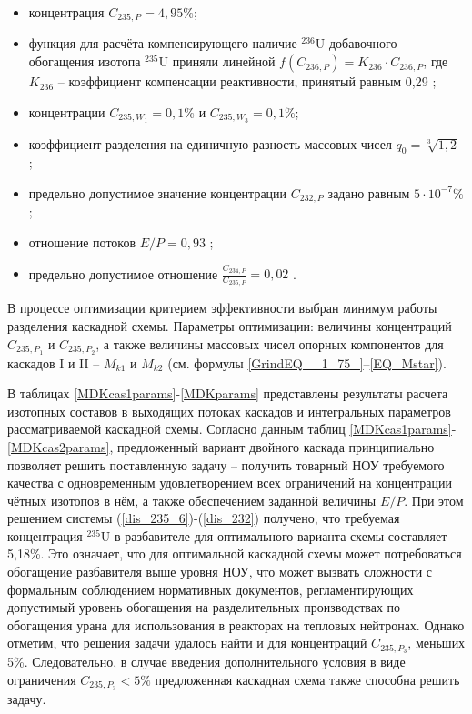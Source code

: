 \begin{itemize}
    \item концентрация $C_{235,{P}} = {4,95\%}$; 
    \item функция для расчёта компенсирующего наличие $^{236}$U добавочного обогащения изотопа $^{235}$U приняли линейной $f(C_{236,P}) = {K_{236}\cdot{C_{236,{P}}}}$, где $K_{236}$ -- коэффициент компенсации реактивности, принятый равным 0,29 \cite{smirnovEvolutionIsotopicComposition2012};
    \item концентрации $C_{235,{W_1}} = 0,1\%$ и $C_{235,{W_3}} = 0,1\%$;
    \item коэффициент разделения на единичную разность массовых чисел $q_{0} = \sqrt[3]{1,2}$ \cite{smirnovEvolutionIsotopicComposition2012};
    \item предельно допустимое значение концентрации $C_{232,{P}}$ задано равным $5\cdot10^{-7} \%$;
    \item отношение потоков $E/P = 0,93$ \cite{smirnovObogashchenieRegenerirovannogoUrana2018};
    \item предельно допустимое отношение $\frac{C_{234,{P}}}{C_{235,{P}}} = 0,02$ \cite{smirnovObogashchenieRegenerirovannogoUrana2018}. 
\end{itemize}

В процессе оптимизации критерием эффективности выбран минимум работы разделения каскадной схемы. Параметры оптимизации: величины концентраций $C_{235,{P_1}}$ и $C_{235,{P_2}}$, а также величины массовых чисел опорных компонентов для каскадов I и II -- $M_{k1}$ и $M_{k2}$ (см. формулы \ref{GrindEQ__1_75_}--\ref{EQ_Mstar}). 

В таблицах \ref{MDKcas1params}-\ref{MDKparams} представлены результаты расчета изотопных составов в выходящих потоках каскадов и интегральных параметров рассматриваемой каскадной схемы. Согласно данным таблиц \ref{MDKcas1params}-\ref{MDKcas2params}, предложенный вариант двойного каскада принципиально позволяет решить поставленную задачу -- получить товарный НОУ требуемого качества с одновременным удовлетворением всех ограничений на концентрации чётных изотопов в нём, а также обеспечением заданной величины $E/P$. При этом решением системы (\ref{dis_235_6})-(\ref{dis_232}) получено, что требуемая концентрация $^{235}$U в разбавителе для оптимального варианта схемы составляет 5,18\%. Это означает, что для оптимальной каскадной схемы может потребоваться обогащение разбавителя выше уровня НОУ, что может вызвать сложности с формальным соблюдением нормативных документов, регламентирующих допустимый уровень обогащения на разделительных производствах по обогащения урана для использования в реакторах на тепловых нейтронах. Однако отметим, что решения задачи удалось найти и для концентраций $C_{235,{P_3}}$, меньших 5\%. Следовательно, в случае введения дополнительного условия в виде ограничения $C_{235,{P_3}} < 5\%$ предложенная каскадная схема также способна решить задачу. 

